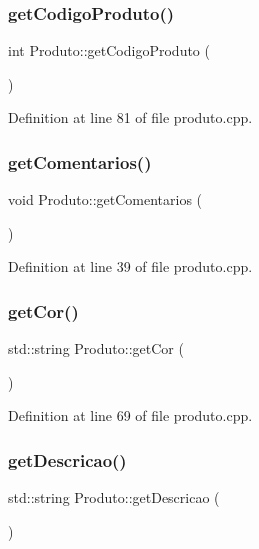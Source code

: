 \subsubsection{\texorpdfstring{get\+Codigo\+Produto()}{getCodigoProduto()}}
{\footnotesize\ttfamily int Produto\+::get\+Codigo\+Produto (\begin{DoxyParamCaption}{ }\end{DoxyParamCaption})}



Definition at line 81 of file produto.\+cpp.

\mbox{\label{class_produto_a08ebfe9f9f49658fe98643a5987cc9fa}} 
\subsubsection{\texorpdfstring{get\+Comentarios()}{getComentarios()}}
{\footnotesize\ttfamily void Produto\+::get\+Comentarios (\begin{DoxyParamCaption}{ }\end{DoxyParamCaption})}



Definition at line 39 of file produto.\+cpp.

\mbox{\label{class_produto_a013a5ed4ca3e82c4836e0b6b21bd552e}} 
\subsubsection{\texorpdfstring{get\+Cor()}{getCor()}}
{\footnotesize\ttfamily std\+::string Produto\+::get\+Cor (\begin{DoxyParamCaption}{ }\end{DoxyParamCaption})}



Definition at line 69 of file produto.\+cpp.

\mbox{\label{class_produto_ada2c72e139e09afa967aa06a4290d5f8}} 
\subsubsection{\texorpdfstring{get\+Descricao()}{getDescricao()}}
{\footnotesize\ttfamily std\+::string Produto\+::get\+Descricao (\begin{DoxyParamCaption}{ }\end{DoxyParamCaption})}




